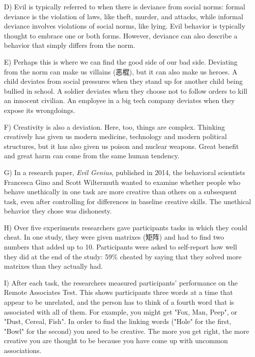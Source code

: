 \documentclass[UTF8,11pt]{ctexart}
\begin{document}
D) Evil is typically referred to when there is deviance from social norms: formal deviance is the violation of laws, like theft, murder, and attacks, while informal deviance involves violations of social norms, like lying. Evil behavior is typically thought to embrace one or both forms. However, deviance can also describe a behavior that simply differs from the norm.


E) Perhaps this is where we can find the good side of our bad side. Deviating from the norm can make us villains (恶棍), but it can also make us heroes. A child deviates from social pressures when they stand up for another child being bullied in school. A soldier deviates when they choose not to follow orders to kill an innocent civilian. An employee in a big tech company deviates when they expose its wrongdoings.


F) Creativity is also a deviation. Here, too, things are complex. Thinking creatively has given us modern medicine, technology and modern political structures, but it has also given us poison and nuclear weapons. Great benefit and great harm can come from the same human tendency.


G) In a research paper, \textit{Evil Genius}, published in 2014, the behavioral scientists Francesca Gino and Scott Wiltermuth wanted to examine whether people who behave unethically in one task are more creative than others on a subsequent task, even after controlling for differences in baseline creative skills. The unethical behavior they chose was dishonesty.


H) Over five experiments researchers gave participants tasks in which they could cheat. In one study, they were given matrixes (矩阵) and had to find two numbers that added up to 10. Participants were asked to self-report how well they did at the end of the study: 59\% cheated by saying that they solved more matrixes than they actually had.


I) After each task, the researchers measured participants' performance on the Remote Associates Test. This shows participants three words at a time that appear to be unrelated, and the person has to think of a fourth word that is associated with all of them. For example, you might get "Fox, Man, Peep", or "Dust, Cereal, Fish". In order to find the linking words ("Hole" for the first, "Bowl" for the second) you need to be creative. The more you get right, the more creative you are thought to be because you have come up with uncommon associations.
\end{document}
